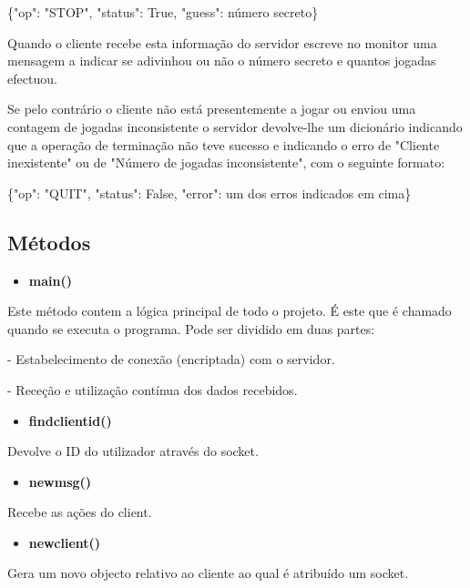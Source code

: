 \documentclass{report}
\begin{document}
\{"op": "STOP", "status": True, "guess": número secreto\}
\newline

Quando o cliente recebe esta informação do servidor escreve no monitor uma mensagem a indicar se adivinhou ou não o número secreto e quantos jogadas efectuou.
\newline

Se pelo contrário o cliente não está presentemente a jogar ou enviou uma contagem
de jogadas inconsistente o servidor devolve-lhe um dicionário indicando que a operação de terminação não teve sucesso e indicando o erro de "Cliente inexistente" ou
de "Número de jogadas inconsistente", com o seguinte formato:
\newline

\{"op": "QUIT", "status": False, "error": um dos erros indicados em cima\}



\subsection{Métodos}
\begin{itemize}
	\item \textbf{main()}
\end{itemize}


Este método contem a lógica principal de todo o projeto.
É este que é chamado quando se executa o programa.
Pode ser dividido em duas partes:

- Estabelecimento de conexão (encriptada) com o servidor.\newline

- Receção e utilização contínua dos dados recebidos.\newline

\begin{itemize}
	\item \textbf{find\textunderscore client\textunderscore id()}
\end{itemize}
Devolve o ID do utilizador através do socket.

\begin{itemize}
	\item \textbf{new\textunderscore msg()}
\end{itemize}
 Recebe as ações do client.
 
\begin{itemize}
	\item \textbf {new\textunderscore client()}
\end{itemize}
 Gera um novo objecto relativo ao cliente ao qual é atribuído um socket.
\end{document}
